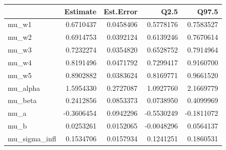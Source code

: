 
\begin{tabular}{lrrrr}
\toprule
  & Estimate & Est.Error & Q2.5 & Q97.5\\
\midrule
mu\_w1 & 0.6710437 & 0.0458406 & 0.5778176 & 0.7583527\\
mu\_w2 & 0.6914753 & 0.0392124 & 0.6139246 & 0.7670614\\
mu\_w3 & 0.7232274 & 0.0354820 & 0.6528752 & 0.7914964\\
mu\_w4 & 0.8191496 & 0.0471792 & 0.7299417 & 0.9160700\\
mu\_w5 & 0.8902882 & 0.0383624 & 0.8169771 & 0.9661520\\
\addlinespace
mu\_alpha & 1.5954330 & 0.2727087 & 1.0927760 & 2.1669779\\
mu\_beta & 0.2412856 & 0.0853373 & 0.0738950 & 0.4099969\\
mu\_a & -0.3606454 & 0.0942296 & -0.5530249 & -0.1811072\\
mu\_b & 0.0253261 & 0.0152065 & -0.0048296 & 0.0564137\\
mu\_sigma\_infl & 0.1534706 & 0.0157934 & 0.1241251 & 0.1860531\\
\bottomrule
\end{tabular}
